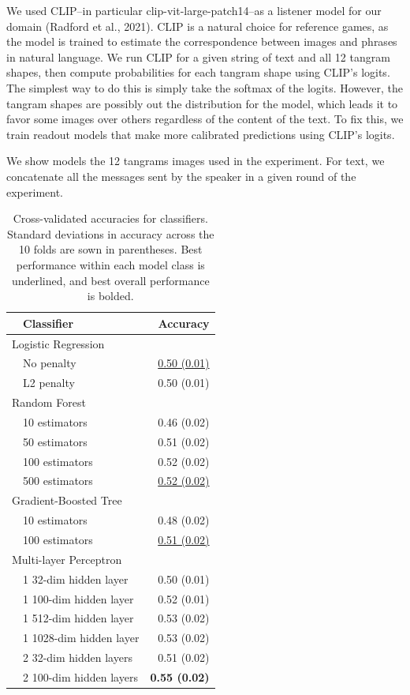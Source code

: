 \documentclass[10pt, letterpaper]{article}
\begin{document}
We used CLIP--in particular clip-vit-large-patch14--as a listener model
for our domain (Radford et al., 2021). CLIP is a natural choice for
reference games, as the model is trained to estimate the correspondence
between images and phrases in natural language. We run CLIP for a given
string of text and all 12 tangram shapes, then compute probabilities for
each tangram shape using CLIP's logits. The simplest way to do this is
simply take the softmax of the logits. However, the tangram shapes are
possibly out the distribution for the model, which leads it to favor
some images over others regardless of the content of the text. To fix
this, we train readout models that make more calibrated predictions
using CLIP's logits.

We show models the 12 tangrams images used in the experiment. For text,
we concatenate all the messages sent by the speaker in a given round of
the experiment.

\begin{table}
\label{classifier-comparison}
\caption{Cross-validated accuracies for classifiers. Standard deviations in accuracy across the 10 folds are sown in parentheses. Best performance within each model class is underlined, and best overall performance is bolded. }
\centering

    \begin{tabular}{p{1em}lr}
        \hline
        &Classifier & Accuracy \\ 
        \hline
            \multicolumn{2}{l}{Logistic Regression} & \\
                    & No penalty & \underline{0.50 (0.01)} \\ 
        & L2 penalty & 0.50  (0.01) \\ 
        \multicolumn{2}{l}{Random Forest} & \\
            & 10 estimators & 0.46 (0.02) \\
                    & 50 estimators  & 0.51 (0.02)\\ 
        & 100 estimators & 0.52 (0.02) \\ 
        & 500 estimators & \underline{0.52 (0.02)} \\ 

        \multicolumn{2}{l}{Gradient-Boosted Tree} & \\
                & 10 estimators & 0.48 (0.02) \\ 
        & 100 estimators & \underline{0.51 (0.02)} \\ 
        \multicolumn{2}{l}{Multi-layer Perceptron} & \\
    & 1 32-dim hidden layer & 0.50 (0.01) \\ 
        & 1 100-dim hidden layer  & 0.52 (0.01) \\ 
            & 1 512-dim hidden layer & 0.53 (0.02) \\ 
    & 1 1028-dim hidden layer & 0.53 (0.02) \\ 
        & 2 32-dim hidden layers  & 0.51 (0.02) \\ 
        & 2 100-dim hidden layers & \textbf{0.55 (0.02)} \\ 
    \hline
    \end{tabular}
\end{table}
\end{document}
